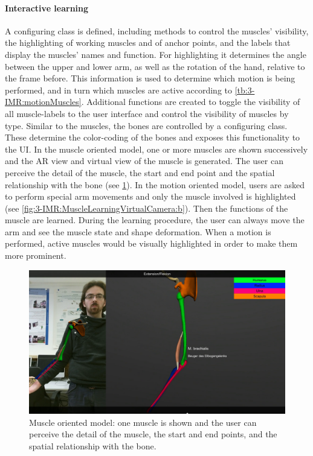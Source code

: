 \paragraph{Interactive learning}
A configuring class is defined, including methods to control the muscles' visibility, the highlighting of working muscles and of anchor points, and the labels that display the muscles' names and function. For highlighting it determines the angle between the upper and lower arm, as well as the rotation of the hand, relative to the frame before. This information is used to determine which motion is being performed, and in turn which muscles are active according to \tablename{\ref{tb:3-IMR:motionMuscles}}. 
Additional functions are created to toggle the visibility of all muscle-labels to the user interface and control the visibility of muscles by type.
Similar to the muscles, the bones are controlled by a configuring class. These determine the color-coding of the bones and exposes this functionality to the UI.
In the muscle oriented model, one or more muscles are shown successively and the AR view and virtual view of the muscle is generated. The user can perceive the detail of the muscle, the start and end point and the spatial relationship with the bone (see \figurename{\ref{fig:3-IMR:muscleModelLearning}}). 
In the motion oriented model, users are asked to perform special arm movements and only the muscle involved is highlighted (see \figurename{\ref{fig:3-IMR:MuscleLearningVirtualCamera:b}}). Then the functions of the muscle are learned. 
During the learning procedure, the user can always move the arm and see the muscle state and shape deformation.
When a motion is performed, active muscles would be visually highlighted in order to make them more prominent.
\begin{figure}
\centering
\includegraphics[width=0.8\linewidth]{figures/3-IMR/muscleModel}
\caption{Muscle oriented model: one muscle is shown and the user can perceive the detail of the muscle, the start and end points, and the spatial relationship with the bone.}
\label{fig:3-IMR:muscleModelLearning}
\end{figure}

